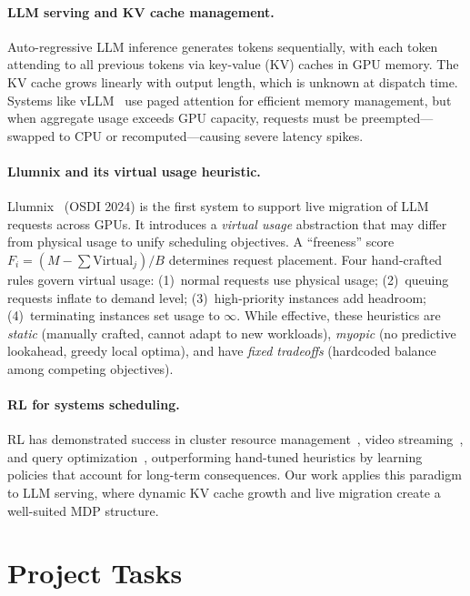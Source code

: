 \documentclass{article}
\begin{document}
\paragraph{LLM serving and KV cache management.}
Auto-regressive LLM inference generates tokens sequentially, with each token attending to all previous tokens via key-value (KV) caches in GPU memory. The KV cache grows linearly with output length, which is unknown at dispatch time. Systems like vLLM~\cite{kwon2023vllm} use paged attention for efficient memory management, but when aggregate usage exceeds GPU capacity, requests must be preempted---swapped to CPU or recomputed---causing severe latency spikes.

\paragraph{Llumnix and its virtual usage heuristic.}
Llumnix~\cite{sun2024llumnix} (OSDI 2024) is the first system to support live migration of LLM requests across GPUs. It introduces a \emph{virtual usage} abstraction that may differ from physical usage to unify scheduling objectives. A ``freeness'' score $F_i = (M - \sum \text{Virtual}_j) / B$ determines request placement. Four hand-crafted rules govern virtual usage: (1)~normal requests use physical usage; (2)~queuing requests inflate to demand level; (3)~high-priority instances add headroom; (4)~terminating instances set usage to $\infty$. While effective, these heuristics are \emph{static} (manually crafted, cannot adapt to new workloads), \emph{myopic} (no predictive lookahead, greedy local optima), and have \emph{fixed tradeoffs} (hardcoded balance among competing objectives).

\paragraph{RL for systems scheduling.}
RL has demonstrated success in cluster resource management~\cite{mao2016resource}, video streaming~\cite{mao2017neural}, and query optimization~\cite{marcus2018towards}, outperforming hand-tuned heuristics by learning policies that account for long-term consequences. Our work applies this paradigm to LLM serving, where dynamic KV cache growth and live migration create a well-suited MDP structure.

\vspace{-0.5em}
\section{Project Tasks}
\vspace{-0.3em}
\end{document}
